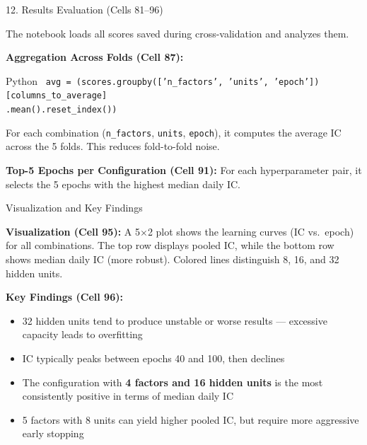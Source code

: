 \documentclass[aspectratio=169, 11pt]{beamer}
\begin{document}
\begin{frame}{12. Results Evaluation (Cells 81--96)}

The notebook loads all scores saved during cross-validation and analyzes them.

\vspace{0.3cm}

\textbf{Aggregation Across Folds (Cell 87):}

\vspace{0.2cm}

\begin{block}{Python}
\small
\texttt{
avg = (scores.groupby(['n\_factors', 'units', 'epoch'])[columns\_to\_average] \\
\hspace{0.8cm} .mean().reset\_index())
}
\end{block}

\vspace{0.3cm}

For each combination (\texttt{n\_factors}, \texttt{units}, \texttt{epoch}), it computes the average IC across the 5 folds. This reduces fold-to-fold noise.

\vspace{0.3cm}

\textbf{Top-5 Epochs per Configuration (Cell 91):} For each hyperparameter pair, it selects the 5 epochs with the highest median daily IC.

\end{frame}
%
%
\begin{frame}{Visualization and Key Findings}

\textbf{Visualization (Cell 95):} A 5$\times$2 plot shows the learning curves (IC vs.\ epoch) for all combinations. The top row displays pooled IC, while the bottom row shows median daily IC (more robust). Colored lines distinguish 8, 16, and 32 hidden units.

\vspace{0.3cm}

\textbf{Key Findings (Cell 96):}

\vspace{0.2cm}

\begin{itemize}
    \item 32 hidden units tend to produce unstable or worse results — excessive capacity leads to overfitting
    \item IC typically peaks between epochs 40 and 100, then declines
    \item The configuration with \textbf{4 factors and 16 hidden units} is the most consistently positive in terms of median daily IC
    \item 5 factors with 8 units can yield higher pooled IC, but require more aggressive early stopping
\end{itemize}

\end{frame}
\end{document}
